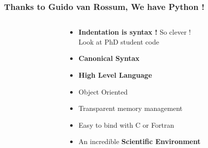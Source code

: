 \begin{frame}
  \frametitle{Thanks to Guido van Rossum, We have Python !}
  \begin{columns}
    \begin{column}{.3\textwidth}
      \begin{center}
      \end{center}
    \end{column}
    \begin{column}{.7\textwidth}
      \begin{itemize}
      \item \textbf{Indentation is syntax !} So clever ! \\
        {\tiny Look at PhD student \Cpp{} code}
      \item \textbf{Canonical Syntax}
      \item \textbf{High Level Language}
      \item Object Oriented
      \item Transparent memory management
      \item Easy to bind with C or Fortran
      \item An incredible \textbf{Scientific Environment}
      \end{itemize}
    \end{column}
  \end{columns}
\end{frame}

